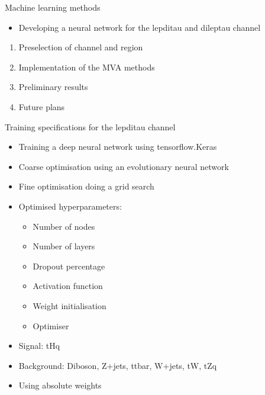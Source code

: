 \begin{frame}{Machine learning methods}
  \begin{itemize}
    \item Developing a neural network for the lepditau and dileptau channel
  \end{itemize}
  \vspace{1cm}
  \begin{enumerate}
    \item Preselection of channel and region
    \item Implementation of the MVA methods
    \item Preliminary results
    \item Future plans
  \end{enumerate}
\end{frame}

  
\begin{frame}{Training specifications for the lepditau channel}
  \begin{itemize}
      \item Training a deep neural network using tensorflow.Keras
      \vspace{0.2cm}
      \item Coarse optimisation using an evolutionary neural network
      \vspace{0.2cm}
      \item Fine optimisation doing a grid search
      \vspace{0.2cm}
      \item Optimised hyperparameters:
          \begin{itemize}
              \item Number of nodes
              \item Number of layers
              \item Dropout percentage
              \item Activation function
              \item Weight initialisation
              \item Optimiser
          \end{itemize}
      \item Signal: tHq
      \item Background: Diboson, Z+jets, ttbar, W+jets, tW, tZq
      \item Using absolute weights
  \end{itemize}
\end{frame}